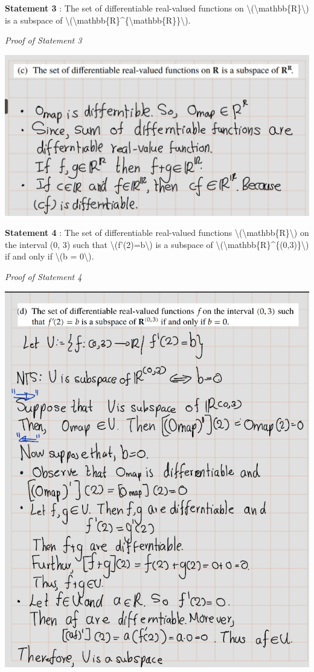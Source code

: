 \documentclass[
]{book}
\theoremstyle{definition}
\theoremstyle{definition}
\theoremstyle{definition}
\theoremstyle{definition}
\theoremstyle{remark}
\begin{document}
\textbf{Statement 3} : The set of differentiable real-valued functions on \textbackslash(\textbackslash mathbb\{R\}\textbackslash) is a subspace of \textbackslash(\textbackslash mathbb\{R\}\^{}\{\textbackslash mathbb\{R\}\}\textbackslash).

\emph{Proof of Statement 3}

\includegraphics{fig/Ex1C/Ex2-c.png}

\textbf{Statement 4} : The set of differentiable real-valued functions \textbackslash(\textbackslash mathbb\{R\}\textbackslash) on the interval (0, 3) such that \textbackslash(f'(2)=b\textbackslash) is a subspace of \textbackslash(\textbackslash mathbb\{R\}\^{}\{(0,3)\}\textbackslash) if and only if \textbackslash(b = 0\textbackslash).

\emph{Proof of Statement 4}

\includegraphics{fig/Ex1C/Ex2-d.png}
\end{document}
